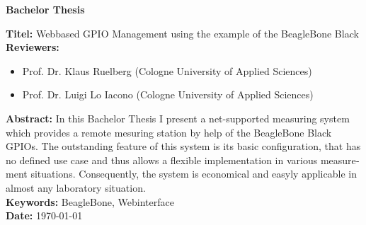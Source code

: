 \begin{otherlanguage}{english}

\begin{center}
	\textbf{Bachelor Thesis}
\end{center}

\noindent \textbf{Titel:} Webbased GPIO Management using the example of the BeagleBone Black\\

\noindent \textbf{Reviewers:}
\begin{itemize}
	\item Prof. Dr. Klaus Ruelberg (Cologne University of Applied Sciences)
	\item Prof. Dr. Luigi Lo Iacono (Cologne University of Applied Sciences)
\end{itemize}

\noindent \textbf{Abstract:} In this Bachelor Thesis I present a net-supported measuring system which provides a remote mesuring station by help of the BeagleBone Black GPIOs. The outstanding feature of this system is its basic configuration, that has no defined use case and thus allows a flexible implementation in various measurement situations. Consequently, the system is economical and easyly applicable in almost any laboratory situation.\\

\noindent \textbf{Keywords:} BeagleBone, Webinterface\\
\noindent \textbf{Date:} {\longdate \today}

\end{otherlanguage}
